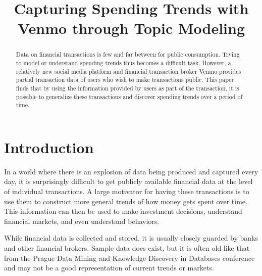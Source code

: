 \documentclass[conference]{IEEEtran}
\begin{document}
\title{Capturing Spending Trends with Venmo through Topic Modeling}

\author{
}


\maketitle

\begin{abstract}
Data on financial transactions is few and far between for public consumption. Trying to model or understand spending trends thus becomes a difficult task. However, a relatively new social media platform and financial transaction broker Venmo provides partial transaction data of users who wish to make transactions public. This paper finds that by using the information provided by users as part of the transaction, it is possible to generalize these transactions and discover spending trends over a period of time. 
\end{abstract}


\section{Introduction}
In a world where there is an explosion of data being produced and captured every day, it is surprisingly difficult to get publicly available financial data at the level of individual transactions. A large motivator for having these transactions is to use them to construct more general trends of how money gets spent over time. This information can then be used to make investment decisions, understand financial markets, and even understand behaviors. 

While financial data is collected and stored, it is usually closely guarded by banks and other financial brokers. Sample data does exist, but it is often old like that from the Prague Data Mining and Knowledge Discovery in Databases conference \cite{PKDD99} and may not be a good representation of current trends or markets. 
\end{document}
